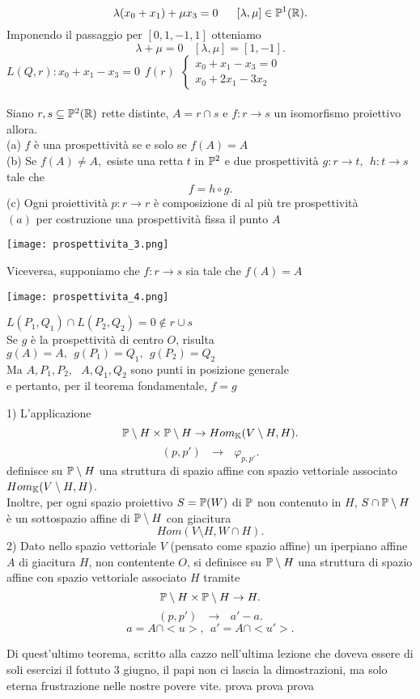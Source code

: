 \documentclass[12px]{article}
\begin{document}
\[
	\lambda(x_0+x_1)+\mu x_3=0 \ \ \ \ \ [\lambda,\mu]\in\pro^1(\R)
.\]
Imponendo il passaggio per $[0,1,-1,1]$ otteniamo\\
\[
	\lambda + \mu =0 \ \ \ \ [\lambda,\mu] = [1,-1]
.\] 
$L(Q,r):x_0+x_1-x_3=0 \ \ f(r) \ \  \begin{cases}
	x_0+x_1-x_3=0\\
	x_0+2x_1-3x_2
\end{cases}$
\ \\ \hline\ \\ 
Siano $r,s\subseteq\mathbb{P}^2(\mathbb{R})$ rette distinte, $A=r\cap s$ e $f:r \rightarrow s$ un isomorfismo proiettivo allora.\\
(a) $f$ è una prospettività se e solo se $f(A) = A$\\
(b) Se  $f(A)\neq A , $ esiste una retta $t$ in $\mathbb{P}^2$ e due prospettività $g: r \rightarrow t, \ \ h : t \rightarrow s$ tale che
\[
 f = h\circ g
.\] 
(c) Ogni proiettività $p:r \rightarrow r$ è composizione di al più tre prospettività
\\
$(a)$ per costruzione una prospettività fissa il punto $A$\\
\begin{center}
\texttt{[image: prospettivita\_3.png]}
\end{center}
 Viceversa, supponiamo che $f:r \rightarrow s$ sia tale che $f(A) = A$ 
\begin{center}
\texttt{[image: prospettivita\_4.png]}
\end{center}
 $L(P_1,Q_1)\cap L(P_2,Q_2) = 0 \not \in r\cup s$\\
 Se $g$ è la prospettività di centro $O$, risulta $g(A) = A,\ \  g(P_1)=Q_1, \ \ g(P_2)=Q_2$\\
 Ma $A,P_1,P_2, \ \ \ A,Q_1,Q_2$ sono punti in posizione generale\\
 e pertanto, per il teorema fondamentale, $f=g$
 \begin{teo}
 	1) L'applicazione 
	\[
		\mathbb{P}\setminus H\times\mathbb{P}\setminus H \rightarrow Hom_{\mathbb{K}}(V\setminus H, H)
	.\] 
	\[
		(p,p') \ \ \ \rightarrow \ \ \ \varphi_{p,p'}
	.\] 
	definisce su $\mathbb{P}\setminus H$ una struttura di spazio affine con spazio vettoriale associato $Hom_{\mathbb{K}}(V\setminus H, H)$.\\
	Inoltre, per ogni spazio proiettivo $S = \mathbb{P}(W)$ di $\mathbb{P}$ non contenuto in  $H$, $S\cap \mathbb{P}\setminus H$ è un sottospazio affine di $\mathbb{P}\setminus H$ con giacitura
	\[
	Hom(V\setminus H, W\cap H)
	.\] 
	2) Dato nello spazio vettoriale $V$ (pensato come spazio affine) un iperpiano affine $A$ di giacitura $H$, non contentente $O$, si definisce su $\mathbb{P}\setminus H$ una struttura di spazio affine con spazio vettoriale associato $H$ tramite
	\[
	\mathbb{P}\setminus H\times\mathbb{P}\setminus H \rightarrow H
	.\] 
	\[
		(p,p') \ \ \ \rightarrow \ \ \ a'-a
	.\] 
	\[
	a = A\cap <u>, \ \ a' = A\cap <u'>
	.\] 
 \end{teo}
 Di quest'ultimo teorema, scritto alla cazzo nell'ultima lezione che doveva essere di soli esercizi il fottuto 3 giugno, il papi non ci lascia la dimostrazioni, ma solo eterna frustrazione nelle nostre povere vite.
 prova prova prova
\end{document}
